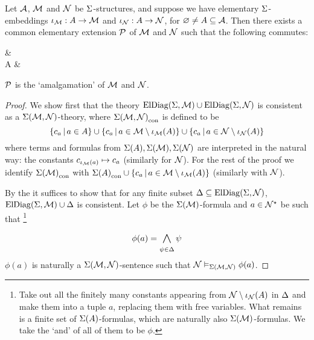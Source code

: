 \begin{cor}[Amalgamation]
    Let $\AA$, $\MM$ and $\NN$ be $\Si$-structures,
    and suppose we have  
    elementary $\Si$-embeddings
    $\io_\MM : A \to \MM$ and 
    $\io_\NN : A \to \NN$, for $\nothing \ne A \subs \AA$.
    Then there exists a common elementary extension $\PP$ of $\MM$ and $\NN$
    such that the following commutes:
    \begin{cd}
        \MM \ar[r] &\PP \\
        A \ar[u, "\io_\MM"] \ar[r, "\io_\NN"] &\NN \ar[u]
    \end{cd}
    $\PP$ is the `amalgamation' of $\MM$ and $\NN$.
\end{cor}
\begin{proof}
    We show first that the theory $\eldiag{\Si}{\MM} \cup \eldiag{\Si}{\NN}$
    is consistent as a $\Si(\MM,\NN)$-theory, where $\const{\Si(\MM,\NN)}$ is 
    defined to be 
    \[
        \set{c_a \st a \in A} \cup 
        \set{c_a \st a \in \MM \setminus \io_\MM(A)}
        \cup \set{c_a \st a \in \NN \setminus \io_\NN(A)}
    \]
    where terms and formulas from $\Si(A), \Si(\MM), \Si(\NN)$ 
    are interpreted in the natural way: 
    the constants $c_{\io_\MM(a)} \mapsto c_a$ (similarly for $\NN$).
    For the rest of the proof we identify 
    $\const{\Si(\MM)}$ with
    $\const{\Si(A)} \cup \set{c_a \st a \in \MM \setminus \io_\MM(A)}$
    (similarly with $\NN$). 

    By the  it suffices to show that 
    for any finite subset $\De \subs \eldiag{\Si}{\NN}$,
    $\eldiag{\Si}{\MM} \cup \De$ is consistent.
    Let $\phi$ be the $\Si(\MM)$-formula and $a \in \NN^\star$ be such 
    that \footnote{Take out all the finitely many constants appearing from 
        $\NN \setminus \io_{\NN}(A)$ in 
        $\De$ and make them into a tuple $a$, 
        replacing them with free variables.
        What remains is a finite set of $\Si(A)$-formulas, 
        which are naturally also $\Si(\MM)$-formulas. 
        We take the `and' of all of them to be $\phi$.}
    \[\phi(a) = \bigand{\psi \in \De}{} \psi\]
    $\phi(a)$ is naturally a $\Si(\MM,\NN)$-sentence such that 
    $\NN \model{\Si(\MM,\NN)} \phi(a)$.
    

\end{proof}
